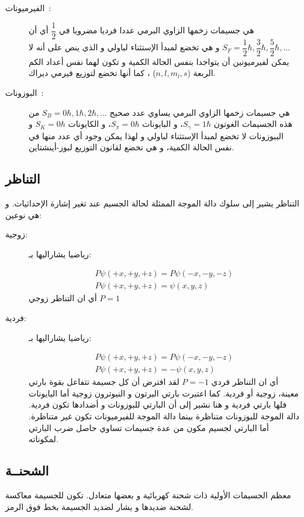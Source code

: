 \begin{description}
	\item[الفيرميونات~:]
هي جسيمات زخمها الزاوي البرمي عددا فرديا مضروبا في 
$\dfrac{1}{2}$
أي أن 
$S_{F}= \dfrac{1}{2}\hbar, \dfrac{3}{2}\hbar, \dfrac{5}{2}\hbar, ...$
و هي تخضع لمبدأ الإستثناء لباولي و الذي ينص على أنه لا يمكن لفيرميونين أن يتواجدا بنفس الحالة الكمية و تكون لهما نفس أعداد الكم الربعة 
($n, l, m_{l}, s$) ، كما أنها تخضع لتوزيع فيرمي ديراك.
	\item[البوزونات~:]
هي جسيمات زخمها الزاوي البرمي يساوي عدد صحيح 
$S_{B}= 0\hbar, 1\hbar, 2\hbar,...$
من هذه الجسيمات الغوتون
$S_{\gamma} =1\hbar$، و البايونات
$S_{\pi} =0\hbar$، و الكايونات 
$S_{K} =0\hbar$
و الببوزونات لا تخضع لمبدأ الإستثناء لباولي و لهذا يمكن وجود أي عدد منها في نفس الحالة الكمية، و هي تخضع لقانون التوزيع لبوز-أينشتاين.
\end{description}

\subsection{ التناظر}
التناظر يشير إلى سلوك دالة الموجة الممثلة لحالة الجسيم عند تغير إشارة الإحداثيات. و هي نوعين: 
\begin{description}
	\item[زوجية:] رياضيا يشاراليها بـ:
	
	\begin{gather*} 
		 P\psi(+x, +y, +z) = P\psi(-x, -y, -z)\\
		 P\psi(+x, +y, +z) = \psi (x, y, z)
	\end{gather*}
أي ان التناظر زوجي $P=1$
\item[فردية:] رياضيا يشاراليها بـ:

\begin{gather*} 
	P\psi(+x, +y, +z) = P\psi(-x, -y, -z)\\
	P\psi(+x, +y, +z) = -\psi (x, y, z)
\end{gather*}
أي ان التناظر فردي $P=-1$
لقد افترض أن كل جسيمة تتفاعل بقوة بارتي معينة، زوجية أو فردية. كما اعتبرت بارتي البرتون و النيوترون زوجية أما البايونات فلها بارتي فردية و هنا نشير إلى أن البارتي للبوزونات و أضدادها تكون فردية. دالة الموجة للبوزونات متناظرة بينما دالة الموجة للفيرميونات تكون غير متناظرة. أما البارتي لجسيم مكون من عدة جسيمات تساوي حاصل ضرب البارتي لمكوناته.
\end{description}
\subsection{ الشحنــة}
معظم الجسيمات اﻷولية ذات شحنة كهربائية و بعضها متعادل. تكون للجسيمة معاكسة لشحنة ضديدها و يشار لضديد الجسيمة بخط فوق الرمز.
